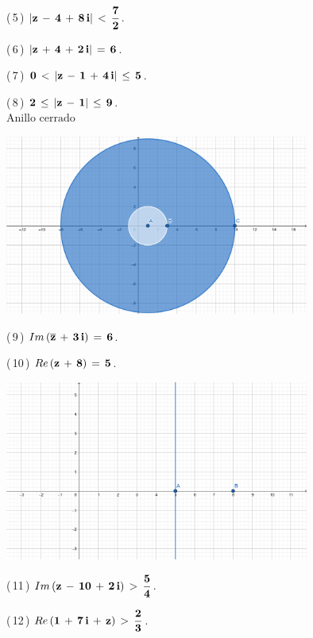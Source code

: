 \documentclass[a4paper,11pt,openany]{book}
\begin{document}
\textcolor{ao(english)}{(\,5\,)} $\bf{|z\,-\,4\,+\,8\,i|\,<\,\dfrac{7}{2}}$.

\textcolor{ao(english)}{(\,6\,)} $\bf{|z\,+\,4\,+\,2\,i|\,=\,6}$.

\textcolor{ao(english)}{(\,7\,)} $\bf{0\,<\,|z\,-\,1\,+\,4\,i|\,\leq\,5}$.

\textcolor{ao(english)}{(\,8\,)} $\bf{2\,\leq\,|z\,-\,1|\,\leq\,9}$.\\
$\text{Anillo cerrado}$

\begin{center}
    \includegraphics[width=10cm]{Gra-Ej-8.png}
\end{center}

\textcolor{ao(english)}{(\,9\,)} $\bf{\mathnormal{Im}\,(\overline{z}\,+\,3\,i)\,=\,6}$.

\textcolor{ao(english)}{(\,10\,)} $\bf{\mathnormal{Re}\,(z\,+\,8)\,=\,5}$.

\begin{center}
    \includegraphics[width=10cm]{Gra-Ej-10.png}
\end{center}

\textcolor{ao(english)}{(\,11\,)} $\bf{\mathnormal{Im}\,(z\,-\,10\,+\,2\,i)\,>\,\dfrac{5}{4}}$.

\textcolor{ao(english)}{(\,12\,)} $\bf{\mathnormal{Re}\,(1\,+\,7\,i\,+\,z)\,>\,\dfrac{2}{3}}$.
\end{document}
